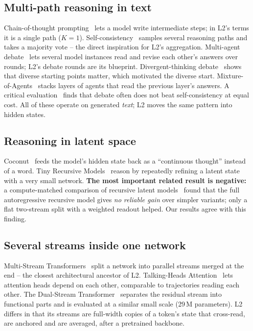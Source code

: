 \documentclass[a4paper,11pt,parskip=half]{scrartcl}
\begin{document}
\subsection{Multi-path reasoning in text}
Chain-of-thought prompting~\cite{wei2022cot} lets a model write intermediate
steps; in L2's terms it is a single path ($K=1$). Self-consistency~\cite{wang2023sc}
samples several reasoning paths and takes a majority vote -- the direct
inspiration for L2's aggregation. Multi-agent debate~\cite{du2023debate} lets
several model instances read and revise each other's answers over rounds; L2's
debate rounds are its blueprint. Divergent-thinking debate~\cite{liang2023divergent}
shows that diverse starting points matter, which motivated the diverse start.
Mixture-of-Agents~\cite{wang2025moa} stacks layers of agents that read the
previous layer's answers. A critical evaluation~\cite{smit2024mad} finds that
debate often does not beat self-consistency at equal cost. All of these
operate on generated \emph{text}; L2 moves the same pattern into hidden states.

\subsection{Reasoning in latent space}
Coconut~\cite{hao2024coconut} feeds the model's hidden state back as a
``continuous thought'' instead of a word. Tiny Recursive Models~\cite{jolicoeur2025trm}
reason by repeatedly refining a latent state with a very small network.
\textbf{The most important related result is negative:} a compute-matched
comparison of recursive latent models~\cite{rauba2026tiny} found that the full
autoregressive recursive model gives \emph{no reliable gain} over simpler
variants; only a flat two-stream split with a weighted readout helped. Our
results agree with this finding.

\subsection{Several streams inside one network}
Multi-Stream Transformers~\cite{burtsev2021multistream} split a network into
parallel streams merged at the end -- the closest architectural ancestor of L2.
Talking-Heads Attention~\cite{shazeer2020talking} lets attention heads depend on
each other, comparable to trajectories reading each other. The Dual-Stream
Transformer~\cite{kerce2026dual} separates the residual stream into functional
parts and is evaluated at a similar small scale (29\,M parameters). L2 differs in
that its streams are full-width copies of a token's state that cross-read,
are anchored and are averaged, after a pretrained backbone.
\end{document}
